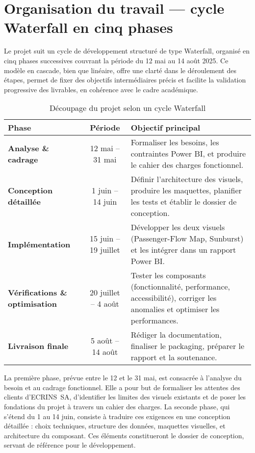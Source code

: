 \section{Organisation du travail — cycle Waterfall en cinq phases}
\label{sec:organisation-waterfall}

Le projet suit un cycle de développement structuré de type Waterfall, organisé en cinq phases successives couvrant la période du 12 mai au 14 août 2025. Ce modèle en cascade, bien que linéaire, offre une clarté dans le déroulement des étapes, permet de fixer des objectifs intermédiaires précis et facilite la validation progressive des livrables, en cohérence avec le cadre académique.

\begin{table}[H]
  \centering
  \caption{Découpage du projet selon un cycle Waterfall}
  \label{tab:planning-waterfall}
  \begin{tabularx}{\textwidth}{@{}>{\bfseries}l c X@{}}
    \toprule
    Phase & Période & Objectif principal \\
    \midrule
    Analyse \& cadrage & 12 mai – 31 mai & Formaliser les besoins, les contraintes Power BI, et produire le cahier des charges fonctionnel. \\
    Conception détaillée & 1 juin – 14 juin & Définir l’architecture des visuels, produire les maquettes, planifier les tests et établir le dossier de conception. \\
    Implémentation & 15 juin – 19 juillet & Développer les deux visuels (Passenger-Flow Map, Sunburst) et les intégrer dans un rapport Power BI. \\
    Vérifications \& optimisation & 20 juillet – 4 août & Tester les composants (fonctionnalité, performance, accessibilité), corriger les anomalies et optimiser les performances. \\
    Livraison finale & 5 août – 14 août & Rédiger la documentation, finaliser le packaging, préparer le rapport et la soutenance. \\
    \bottomrule
  \end{tabularx}
\end{table}

La première phase, prévue entre le 12 et le 31 mai, est consacrée à l’analyse du besoin et au cadrage fonctionnel. Elle a pour but de formaliser les attentes des clients d’ECRINS~SA, d’identifier les limites des visuels existants et de poser les fondations du projet à travers un cahier des charges. La seconde phase, qui s’étend du 1 au 14 juin, consiste à traduire ces exigences en une conception détaillée : choix techniques, structure des données, maquettes visuelles, et architecture du composant. Ces éléments constitueront le dossier de conception, servant de référence pour le développement.

